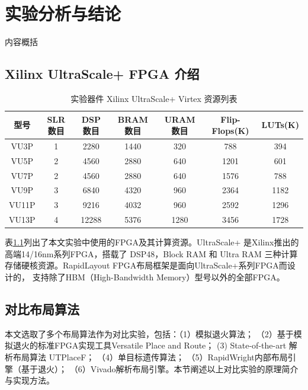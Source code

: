 \chapter{实验分析与结论}

内容概括


\section{Xilinx UltraScale+ FPGA 介绍}

\begin{table}[h]
	\centering
	\caption{实验器件 Xilinx UltraScale+ Virtex 资源列表}		
	\label{tab:fpg}
	\begin{tabular}{c|c c c c c c}
		\toprule[2pt]
        型号 	& SLR数目 & DSP 数目 & BRAM 数目 & URAM 数目 & Flip-Flops(K) & LUTs(K)	\\
        \midrule[2pt]
        VU3P   & 1       & 2280    & 1440     & 320       & 788               & 394 \\
        \hline 
        VU5P   & 2       & 4560    & 2880     & 640       & 1201              & 601 \\
        \hline
        VU7P   & 2       & 4560    & 2880     & 640       & 1576              & 788 \\
        \hline
        VU9P   & 3       & 6840    & 4320     & 960       & 2364              & 1182 \\
        \hline
        VU11P  & 3       & 9216    & 4032     & 960       & 2592              & 1296 \\
        \hline 
        VU13P  & 4       & 12288   & 5376     & 1280      & 3456              & 1728 \\
        \bottomrule[2pt]
	\end{tabular}
\end{table}

表\ref{tab:fpg}列出了本文实验中使用的FPGA及其计算资源。UltraScale+ 是Xilinx推出的高端14/16nm系列FPGA，搭载了
DSP48，Block RAM 和 Ultra RAM 三种计算存储硬核资源。RapidLayout FPGA布局框架是面向UltraScale+系列FPGA而设计的，
支持除了HBM（High-Bandwidth Memory）型号以外的全部FPGA。

\section{对比布局算法}
本文选取了多个布局算法作为对比实验，包括：（1）模拟退火算法； （2）基于模拟退火的标准FPGA实现工具Versatile Place and Route；
(3) State-of-the-art 解析布局算法 UTPlaceF； （4）单目标遗传算法； （5）RapidWright内部布局引擎（基于退火）；
（6）Vivado解析布局引擎。本节阐述以上对比实验的原理简介与实现方法。

